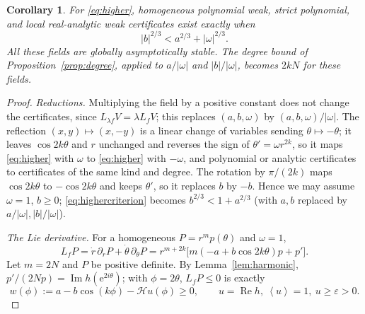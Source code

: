 \documentclass[11pt]{article}
\newtheorem{corollary}[theorem]{Corollary}
\theoremstyle{remark}\newtheorem{remark}[theorem]{Remark}
\newcommand{\Rea}{\operatorname{Re}}
\newcommand{\Ima}{\operatorname{Im}}
\newcommand{\avg}[1]{\left\langle #1\right\rangle}
\newcommand{\ee}{\mathrm e}
\begin{document}
\begin{corollary}\label{cor:higher}
For \eqref{eq:higher}, homogeneous polynomial weak, strict
polynomial, and local real-analytic weak certificates exist
exactly when
\begin{equation}\label{eq:highercriterion}
 |b|^{2/3}<a^{2/3}+|\omega|^{2/3}.
\end{equation}
All these fields are globally asymptotically stable.
The degree bound of Proposition~\ref{prop:degree}, applied to
\(a/|\omega|\) and \(|b|/|\omega|\), becomes \(2kN\) for these fields.
\end{corollary}
\begin{proof}
\emph{Reductions.} Multiplying the field by a positive constant
does not change the certificates, since \(L_{\lambda f}V=\lambda L_fV\);
this replaces \((a,b,\omega)\) by \((a,b,\omega)/|\omega|\). The
reflection \((x,y)\mapsto(x,-y)\) is a linear change of variables
sending \(\theta\mapsto-\theta\); it leaves \(\cos2k\theta\) and
\(r\) unchanged and reverses the sign of \(\theta'=\omega r^{2k}\), so
it maps \eqref{eq:higher} with \(\omega\) to \eqref{eq:higher} with
\(-\omega\), and polynomial or analytic certificates to certificates of
the same kind and degree. The rotation by \(\pi/(2k)\) maps
\(\cos2k\theta\) to \(-\cos2k\theta\) and keeps \(\theta'\), so it
replaces \(b\) by \(-b\). Hence we may assume \(\omega=1\), \(b\ge0\);
\eqref{eq:highercriterion} becomes \(b^{2/3}<1+a^{2/3}\)
(with \(a,b\) replaced by \(a/|\omega|,|b|/|\omega|\)).

\emph{The Lie derivative.} For a homogeneous \(P=r^mp(\theta)\) and
\(\omega=1\),
\[
 L_fP=\dot r\,\partial_rP+\dot\theta\,\partial_\theta P
     =r^{m+2k}\bigl[m(-a+b\cos2k\theta)p+p'\bigr].
\]
Let \(m=2N\) and \(P\) be positive definite. By Lemma~\ref{lem:harmonic},
\(p'/(2Np)=\Ima h(\ee^{2i\theta})\); with \(\phi=2\theta\), \(L_fP\le0\)
is exactly
\begin{equation}\label{eq:weakk}
 w(\phi):=a-b\cos(k\phi)-\mathcal Hu(\phi)\ge0,
 \qquad u=\Rea h,\ \avg u=1,\ u\ge\varepsilon>0 .
\end{equation}


\end{proof}
\end{document}
